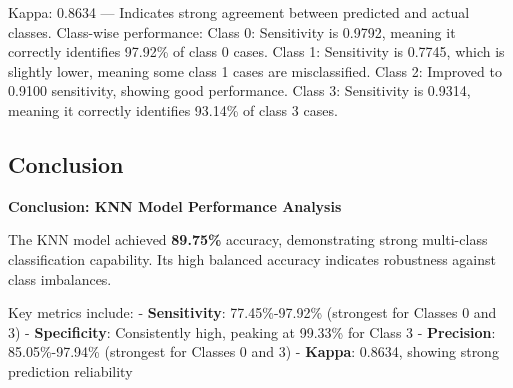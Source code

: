 \documentclass[
]{article}
\begin{document}
Kappa: 0.8634 --- Indicates strong agreement between predicted and
actual classes. Class-wise performance: Class 0: Sensitivity is 0.9792,
meaning it correctly identifies 97.92\% of class 0 cases. Class 1:
Sensitivity is 0.7745, which is slightly lower, meaning some class 1
cases are misclassified. Class 2: Improved to 0.9100 sensitivity,
showing good performance. Class 3: Sensitivity is 0.9314, meaning it
correctly identifies 93.14\% of class 3 cases.

\subsection{Conclusion}\label{conclusion}

\textbf{Conclusion: KNN Model Performance Analysis}

The KNN model achieved \textbf{89.75\%} accuracy, demonstrating strong
multi-class classification capability. Its high balanced accuracy
indicates robustness against class imbalances.

Key metrics include: - \textbf{Sensitivity}: 77.45\%-97.92\% (strongest
for Classes 0 and 3) - \textbf{Specificity}: Consistently high, peaking
at 99.33\% for Class 3 - \textbf{Precision}: 85.05\%-97.94\% (strongest
for Classes 0 and 3) - \textbf{Kappa}: 0.8634, showing strong prediction
reliability
\end{document}
